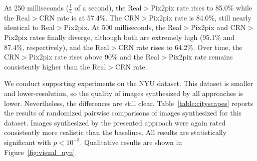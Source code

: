 At 250 milliseconds ($\frac{1}{4}$ of a second), the Real$>$Pix2pix rate rises to 85.0\% while the Real$>$CRN rate is at 57.4\%. The CRN$>$Pix2pix rate is 84.0\%, still nearly identical to Real$>$Pix2pix. At 500 milliseconds, the Real$>$Pix2pix and CRN$>$Pix2pix rates finally diverge, although both are extremely high (95.1\% and 87.4\%, respectively), and the Real$>$CRN rate rises to 64.2\%. Over time, the CRN$>$Pix2pix rate rises above 90\% and the Real$>$Pix2pix rate remains consistently higher than the Real$>$CRN rate.

We conduct supporting experiments on the NYU dataset. This dataset is smaller and lower-resolution, so the quality of images synthesized by all approaches is lower. Nevertheless, the differences are still clear. Table~\ref{table:cityscapes} reports the results of randomized pairwise comparisons of images synthesized for this dataset. Images synthesized by the presented approach were again rated consistently more realistic than the baselines. All results are statistically significant with $p < 10^{-3}$. Qualitative results are shown in Figure~\ref{fig:visual_nyu}.


